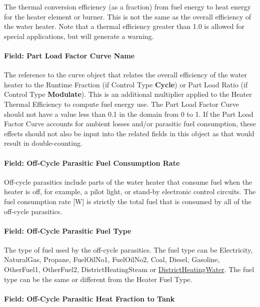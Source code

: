 The thermal conversion efficiency (as a fraction) from fuel energy to heat energy for the heater element or burner. This is not the same as the overall efficiency of the water heater. Note that a thermal efficiency greater than 1.0 is allowed for special applications, but will generate a warning.

\paragraph{Field: Part Load Factor Curve Name}\label{field-part-load-factor-curve-name}

The reference to the curve object that relates the overall efficiency of the water heater to the Runtime Fraction (if Control Type \textbf{Cycle}) or Part Load Ratio (if Control Type \textbf{Modulate}). This is an additional multiplier applied to the Heater Thermal Efficiency to compute fuel energy use. The Part Load Factor Curve should not have a value less than 0.1 in the domain from 0 to 1. If the Part Load Factor Curve accounts for ambient losses and/or parasitic fuel consumption, these effects should not also be input into the related fields in this object as that would result in double-counting.

\paragraph{Field: Off-Cycle Parasitic Fuel Consumption Rate}\label{field-off-cycle-parasitic-fuel-consumption-rate}

Off-cycle parasitics include parts of the water heater that consume fuel when the heater is off, for example, a pilot light, or stand-by electronic control circuits. The fuel consumption rate {[}W{]} is strictly the total fuel that is consumed by all of the off-cycle parasitics.

\paragraph{Field: Off-Cycle Parasitic Fuel Type}\label{field-off-cycle-parasitic-fuel-type}

The type of fuel used by the off-cycle parasitics. The fuel type can be Electricity, NaturalGas, Propane, FuelOilNo1, FuelOilNo2, Coal, Diesel, Gasoline, OtherFuel1, OtherFuel2, DistrictHeatingSteam or \hyperref[districtheating]{DistrictHeatingWater}. The fuel type can be the same or different from the Heater Fuel Type.

\paragraph{Field: Off-Cycle Parasitic Heat Fraction to Tank}\label{field-off-cycle-parasitic-heat-fraction-to-tank}

